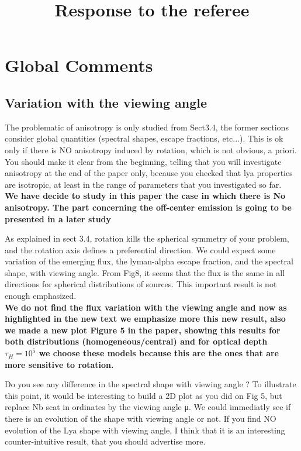 \documentclass[12pt]{article}
\title{Response to the referee}
\begin{document}
\date{}
\maketitle

\section{Global Comments}

\subsection{Variation with the viewing angle}

The problematic of anisotropy is only studied from Sect3.4, the former sections consider global quantities (spectral shapes, escape fractions, etc...). This is ok only if there is NO anisotropy induced by rotation, which is not obvious, a priori. You should make it clear from the beginning, telling that you will investigate anisotropy at the end of the paper only, because you checked that lya properties are isotropic, at least in the range of parameters that you investigated so far.\\


\textbf{ We have decide to study in this paper the case in which there is No anisotropy. The part concerning the off-center emission is going to be presented in a later study\\}

As explained in sect 3.4, rotation kills the spherical symmetry of your problem, and the rotation axis defines a preferential direction. We could expect some variation of the emerging flux, the lyman-alpha escape fraction, and the spectral shape, with viewing angle. From Fig8, it seems that the flux is the same in all directions for spherical distributions of sources. This important result is not enough emphasized.\\

\textbf{We do not find the flux variation with the viewing angle and now as highlighted in the new text we emphasize more this new result, also we made a new plot Figure 5 in the paper, showing this results for both distributions (homogeneous/central) and for optical depth $\tau_{H}=10^{5}$ we choose these models because this are the ones 
that are more sensitive to rotation.\\}

Do you see any difference in the spectral shape with viewing angle ? To illustrate this point, it would be interesting to build a 2D plot as you did on Fig 5, but replace Nb scat in ordinates by the viewing angle μ. We could immediatly see if there is an evolution of the shape with viewing angle or not. If you find NO evolution of the Lya shape with viewing angle, I think that it is an interesting counter-intuitive result, that you should advertise more.\\
\end{document}
